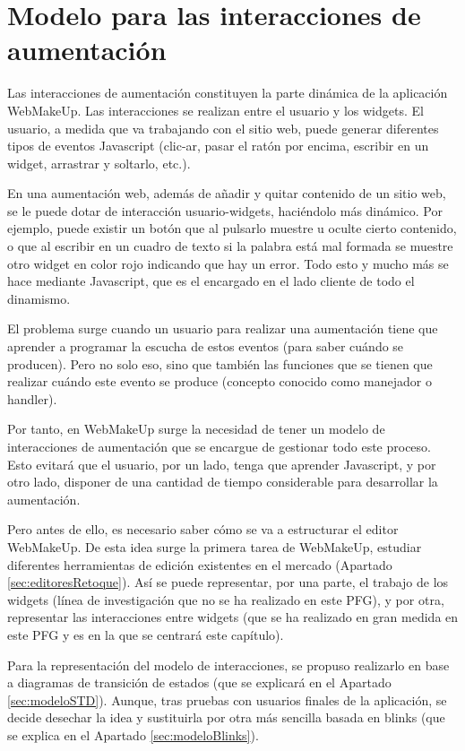 \chapter{Modelo para las interacciones de aumentación}

\label{cha:interacciones}


Las interacciones de aumentación constituyen la parte dinámica de la aplicación WebMakeUp. Las interacciones se realizan entre el usuario y los widgets. El usuario, a medida que va trabajando con el sitio web, puede generar diferentes tipos de eventos Javascript (clic-ar, pasar el ratón por encima, escribir en un widget, arrastrar y soltarlo, etc.).

En una aumentación web, además de añadir y quitar contenido de un sitio web, se le puede dotar de interacción usuario-widgets, haciéndolo más dinámico. Por ejemplo, puede existir un botón que al pulsarlo muestre u oculte cierto contenido, o que al escribir en un cuadro de texto si la palabra está mal formada se muestre otro widget en color rojo indicando que hay un error. Todo esto y mucho más se hace mediante Javascript, que es el encargado en el lado cliente de todo el dinamismo.

El problema surge cuando un usuario para realizar una aumentación tiene que aprender a programar la escucha de estos eventos (para saber cuándo se producen). Pero no solo eso, sino que también las funciones que se tienen que realizar cuándo este evento se produce (concepto conocido como manejador o handler).

Por tanto, en WebMakeUp surge la necesidad de tener un modelo de interacciones de aumentación que se encargue de gestionar todo este proceso. Esto evitará que el usuario, por un lado, tenga que aprender Javascript, y por otro lado, disponer de una cantidad de tiempo considerable para desarrollar la aumentación.

Pero antes de ello, es necesario saber cómo se va a estructurar el editor WebMakeUp. De esta idea surge la primera tarea de WebMakeUp, estudiar diferentes herramientas de edición existentes en el mercado (Apartado \ref{sec:editoresRetoque}). Así se puede representar, por una parte, el trabajo de los widgets (línea de investigación que no se ha realizado en este PFG), y por otra, representar las interacciones entre widgets (que se ha realizado en gran medida en este PFG y es en la que se centrará este capítulo).

Para la representación del modelo de interacciones, se propuso realizarlo en base a diagramas de transición de estados (que se explicará en el Apartado \ref{sec:modeloSTD}). Aunque, tras pruebas con usuarios finales de la aplicación, se decide desechar la idea y sustituirla por otra más sencilla basada en blinks (que se explica en el Apartado \ref{sec:modeloBlinks}).

